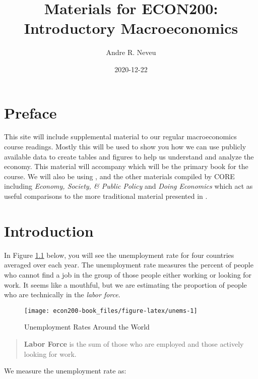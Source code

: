 \documentclass[
]{book}
\title{Materials for ECON200: Introductory Macroeconomics}
\author{Andre R. Neveu}
\date{2020-12-22}
\begin{document}
\maketitle

{
\setcounter{tocdepth}{1}
\tableofcontents
}
\hypertarget{preface}{%
\chapter*{Preface}\label{preface}}

This site will include supplemental material to our regular macroeconomics course readings. Mostly this will be used to show you how we can use publicly available data to create tables and figures to help us understand and analyze the economy. This material will accompany \citet{tw} which will be the primary book for the course. We will also be using \citet{core}, and the other materials compiled by CORE including \emph{Economy, Society, \& Public Policy} \citep{espp} and \emph{Doing Economics} \citep{doing} which act as useful comparisons to the more traditional material presented in \citet{tw}.

\hypertarget{intro}{%
\chapter{Introduction}\label{intro}}

In Figure \ref{fig:unems} below, you will see the unemployment rate for four countries averaged over each year. The unemployment rate measures the percent of people who cannot find a job in the group of those people either working or looking for work. It seems like a mouthful, but we are estimating the proportion of people who are technically in the \emph{labor force}.

\begin{figure}

{\centering \texttt{[image: econ200-book\_files/figure-latex/unems-1]} 

}

\caption{Unemployment Rates Around the World}\label{fig:unems}
\end{figure}

\begin{quote}
\textbf{Labor Force} is the sum of those who are employed and those actively looking for work.
\end{quote}

We measure the unemployment rate as:
\end{document}
